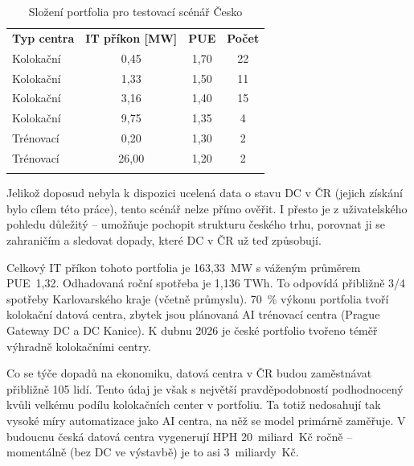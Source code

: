 \begin{table}[b]
    \centering
    \setlength{\tabcolsep}{6pt}

    \caption{Složení portfolia pro testovací scénář Česko}
    \label{tab:portfolio_cesko}

    \begin{tabular}{p{4cm}ccc}
        \toprule
        \addlinespace

        \textbf{Typ centra} & \textbf{IT příkon [MW]} & \textbf{PUE} & \textbf{Počet} \\

        \addlinespace
        \midrule
        \addlinespace

        Kolokační & 0,45 & 1,70 & 22 \\
        Kolokační & 1,33 & 1,50 & 11 \\
        Kolokační & 3,16 & 1,40 & 15 \\
        Kolokační & 9,75 & 1,35 & 4 \\
        Trénovací & 0,20 & 1,30 & 2 \\
        Trénovací & 26,00 & 1,20 & 2 \\

        \addlinespace
        \bottomrule
    \end{tabular}
\end{table}

Jelikož doposud nebyla k dispozici ucelená data o stavu DC v ČR (jejich získání bylo cílem této práce), tento scénář nelze přímo ověřit. I přesto je z uživatelského pohledu důležitý -- umožňuje pochopit strukturu českého trhu, porovnat ji se zahraničím a sledovat dopady, které DC v ČR už teď způsobují.

Celkový IT příkon tohoto portfolia je 163,33~MW s váženým průměrem PUE~1,32. Odhadovaná roční spotřeba je 1,136 TWh. To odpovídá přibližně 3/4 spotřeby Karlovarského kraje (včetně průmyslu). 70~\% výkonu portfolia tvoří kolokační datová centra, zbytek jsou plánovaná AI trénovací centra (Prague Gateway DC a DC Kanice). K dubnu 2026 je české portfolio tvořeno téměř výhradně kolokačními centry.

Co se týče dopadů na ekonomiku, datová centra v ČR budou zaměstnávat přibližně 105 lidí. Tento údaj je však s největší pravděpodobností podhodnocený kvůli velkému podílu kolokačních center v portfoliu. Ta totiž nedosahují tak vysoké míry automatizace jako AI centra, na něž se model primárně zaměřuje. V budoucnu česká datová centra vygenerují HPH 20~miliard~Kč ročně -- momentálně (bez DC ve výstavbě) je to asi 3~miliardy~Kč.

